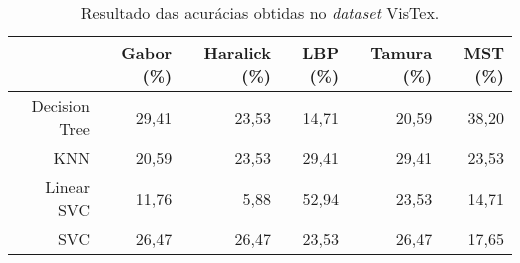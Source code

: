 \begin{table}[H]
    \centering
    \caption[Resultado das acurácias obtidas no VisTex]{Resultado das acurácias obtidas no \textit{dataset} VisTex.
    \label{tab:visTexAcuracias}}
    \begin{tabular}{rrrrrr}
        \toprule
            & Gabor (\%) & Haralick (\%) & LBP (\%) & Tamura (\%) & MST (\%) \\
        \midrule
            Decision Tree & 29,41 & 23,53 & 14,71 & 20,59 & 38,20 \\
            KNN & 20,59 & 23,53 & 29,41 & 29,41 & 23,53 \\
            Linear SVC & 11,76 & 5,88 & 52,94 & 23,53 & 14,71 \\
            SVC & 26,47 & 26,47 & 23,53 & 26,47 & 17,65 \\
        \bottomrule
    \end{tabular}
\end{table}
